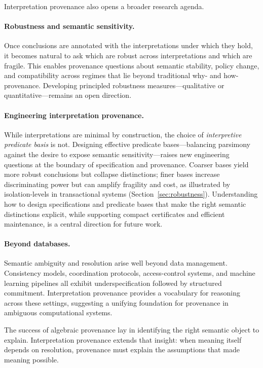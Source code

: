\documentclass[acmsmall,nonacm]{acmart}
\theoremstyle{remark}
\numberwithin{definition}{section}
\numberwithin{theorem}{section}
\numberwithin{lemma}{section}
\numberwithin{corollary}{section}
\numberwithin{remark}{section}
\numberwithin{example}{section}
\numberwithin{observation}{section}
\numberwithin{assumption}{section}
\begin{document}
Interpretation provenance also opens a broader research agenda.

\paragraph{Robustness and semantic sensitivity.}
Once conclusions are annotated with the interpretations under which they hold, it
becomes natural to ask which are robust across interpretations and which are
fragile.
This enables provenance questions about semantic stability, policy change, and
compatibility across regimes that lie beyond traditional why- and how-provenance.
Developing principled robustness measures—qualitative or quantitative—remains an
open direction.

\paragraph{Engineering interpretation provenance.}
While interpretations are minimal by construction, the choice of
\emph{interpretive predicate basis} is not.
Designing effective predicate bases—balancing parsimony against the desire to
expose semantic sensitivity—raises new engineering questions at the boundary of
specification and provenance.
Coarser bases yield more robust conclusions but collapse distinctions; finer
bases increase discriminating power but can amplify fragility and cost, as
illustrated by isolation-levels in transactional systems (Section~\ref{sec:robustness}).
Understanding how to design specifications and predicate bases that make the
right semantic distinctions explicit, while supporting compact certificates and
efficient maintenance, is a central direction for future work.

\paragraph{Beyond databases.}
Semantic ambiguity and resolution arise well beyond data management.
Consistency models, coordination protocols, access-control systems, and machine
learning pipelines all exhibit underspecification followed by structured
commitment.
Interpretation provenance provides a vocabulary for reasoning across these
settings, suggesting a unifying foundation for provenance in ambiguous
computational systems.

The success of algebraic provenance lay in identifying the right semantic object
to explain.
Interpretation provenance extends that insight: when meaning itself depends on
resolution, provenance must explain the assumptions that made meaning possible.
\end{document}
